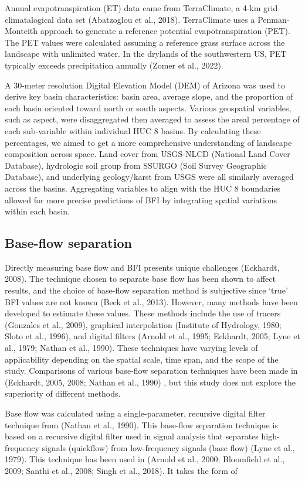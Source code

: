\documentclass[
]{agujournal2019}
\begin{document}
Annual evapotranspiration (ET) data came from TerraClimate, a 4-km grid
climatalogical data set (Abatzoglou et al., 2018). TerraClimate uses a
Penman-Monteith approach to generate a reference potential
evapotranspiration (PET). The PET values were calculated assuming a
reference grass surface across the landscape with unlimited water. In
the drylands of the southwestern US, PET typically exceeds precipitation
annually (Zomer et al., 2022).

A 30-meter resolution Digital Elevation Model (DEM) of Arizona was used
to derive key basin characteristics: basin area, average slope, and the
proportion of each basin oriented toward north or south aspects. Various
geospatial variables, such as aspect, were disaggregated then averaged
to assess the areal percentage of each sub-variable within individual
HUC 8 basins. By calculating these percentages, we aimed to get a more
comprehensive understanding of landscape composition across space. Land
cover from USGS-NLCD (National Land Cover Database), hydrologic soil
group from SSURGO (Soil Survey Geographic Database), and underlying
geology/karst from USGS were all similarly averaged across the basins.
Aggregating variables to align with the HUC 8 boundaries allowed for
more precise predictions of BFI by integrating spatial variations within
each basin.

\subsection{Base-flow separation}\label{sec-bf_sep}

Directly measuring base flow and BFI presents unique challenges
(Eckhardt, 2008). The technique chosen to separate base flow has been
shown to affect results, and the choice of base-flow separation method
is subjective since `true' BFI values are not known (Beck et al., 2013).
However, many methods have been developed to estimate these values.
These methods include the use of tracers (Gonzales et al., 2009),
graphical interpolation (Institute of Hydrology, 1980; Sloto et al.,
1996), and digital filters (Arnold et al., 1995; Eckhardt, 2005; Lyne et
al., 1979; Nathan et al., 1990). These techniques have varying levels of
applicability depending on the spatial scale, time span, and the scope
of the study. Comparisons of various base-flow separation techniques
have been made in (Eckhardt, 2005, 2008; Nathan et al., 1990) , but this
study does not explore the superiority of different methods.

Base flow was calculated using a single-parameter, recursive digital
filter technique from (Nathan et al., 1990). This base-flow separation
technique is based on a recursive digital filter used in signal analysis
that separates high-frequency signals (quickflow) from low-frequency
signals (base flow) (Lyne et al., 1979). This technique has been used in
(Arnold et al., 2000; Bloomfield et al., 2009; Santhi et al., 2008;
Singh et al., 2018). It takes the form of
\end{document}
